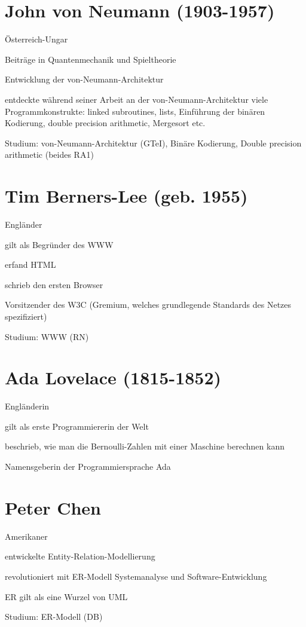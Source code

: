 \documentclass[a4paper,12pt]{report}
\begin{document}
\section{John von Neumann (1903-1957)}
\begin{itemize*}
\item Österreich-Ungar
\item Beiträge in Quantenmechanik und Spieltheorie
\item Entwicklung der von-Neumann-Architektur
\item entdeckte während seiner Arbeit an der von-Neumann-Architektur viele Programmkonstrukte: linked subroutines, lists, Einführung der binären Kodierung, double precision arithmetic, Mergesort etc.
\item Studium: von-Neumann-Architektur (GTeI), Binäre Kodierung, Double precision arithmetic (beides RA1)
\end{itemize*}

\section{Tim Berners-Lee (geb. 1955)}
\begin{itemize*}
\item Engländer
\item gilt als Begründer des WWW
\item erfand HTML
\item schrieb den ersten Browser
\item Vorsitzender des W3C (Gremium, welches grundlegende Standards des Netzes spezifiziert)
\item Studium: WWW (RN)
\end{itemize*}

\section{Ada Lovelace (1815-1852)}
\begin{itemize*}
\item Engländerin
\item gilt als erste Programmiererin der Welt
\item beschrieb, wie man die Bernoulli-Zahlen mit einer Maschine berechnen kann
\item Namensgeberin der Programmiersprache Ada
\end{itemize*}

\section{Peter Chen}
\begin{itemize*}
\item Amerikaner
\item entwickelte Entity-Relation-Modellierung
\item revolutioniert mit ER-Modell Systemanalyse und Software-Entwicklung
\item ER gilt als eine Wurzel von UML
\item Studium: ER-Modell (DB)
\end{itemize*}
\end{document}
